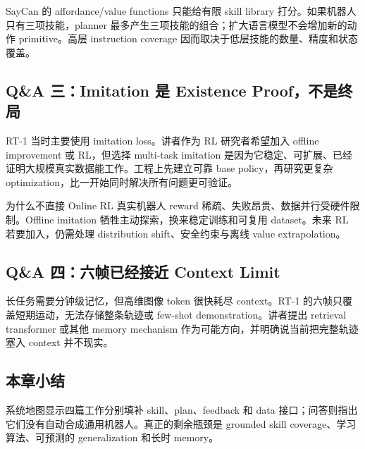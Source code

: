 SayCan 的 affordance/value functions 只能给有限 skill library 打分。如果机器人只有三项技能，planner 最多产生三项技能的组合；扩大语言模型不会增加新的动作 primitive。高层 instruction coverage 因而取决于低层技能的数量、精度和状态覆盖。


\subsection{Q\&A 三：Imitation 是 Existence Proof，不是终局}

RT-1 当时主要使用 imitation loss。讲者作为 RL 研究者希望加入 offline improvement 或 RL，但选择 multi-task imitation 是因为它稳定、可扩展、已经证明大规模真实数据能工作。工程上先建立可靠 base policy，再研究更复杂 optimization，比一开始同时解决所有问题更可验证。

\begin{knowledgebox}{为什么不直接 Online RL}
真实机器人 reward 稀疏、失败昂贵、数据并行受硬件限制。Offline imitation 牺牲主动探索，换来稳定训练和可复用 dataset。未来 RL 若要加入，仍需处理 distribution shift、安全约束与离线 value extrapolation。
\end{knowledgebox}

\subsection{Q\&A 四：六帧已经接近 Context Limit}

长任务需要分钟级记忆，但高维图像 token 很快耗尽 context。RT-1 的六帧只覆盖短期运动，无法存储整条轨迹或 few-shot demonstration。讲者提出 retrieval transformer 或其他 memory mechanism 作为可能方向，并明确说当前把完整轨迹塞入 context 并不现实。


\subsection{本章小结}

系统地图显示四篇工作分别填补 skill、plan、feedback 和 data 接口；问答则指出它们没有自动合成通用机器人。真正的剩余瓶颈是 grounded skill coverage、学习算法、可预测的 generalization 和长时 memory。

